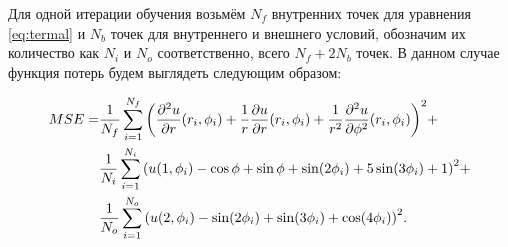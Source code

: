 \documentclass[a4paper,14pt]{extarticle} %
\begin{document}



Для одной итерации обучения возьмём $N_f$ внутренних точек для уравнения \eqref{eq:termal} и $N_b$ точек для внутреннего и внешнего условий, обозначим их количество как $N_i$ и $N_o$ соответственно, всего $N_f+2N_b$ точек. В данном случае функция потерь будем выглядеть следующим образом:

\begin{equation}\label{eq:termal_cond}
    \begin{split}
        MSE =& \frac{1}{N_f}\sum_{i=1}^{N_f} {\left( \frac{\partial^2 u}{\partial r}(r_i, \phi_i) + \frac{1}{r} \frac{\partial u}{\partial r}(r_i, \phi_i) + \frac{1}{r^2}\frac{\partial^2 u}{\partial \phi^2}(r_i, \phi_i) \right)}^2 + \\
        & \frac{1}{N_i}\sum_{i=1}^{N_i} {\left( u(1, \phi_i) - \cos\phi+\sin\phi+\sin(2\phi_i)+5\sin(3\phi_i) + 1 \right)}^2 + \\
        & \frac{1}{N_o}\sum_{i=1}^{N_o} {\left( u(2, \phi_i) - \sin (2\phi_i) +\sin(3\phi_i)+\cos(4\phi_i) \right)}^2.
    \end{split}
\end{equation}
\end{document}
